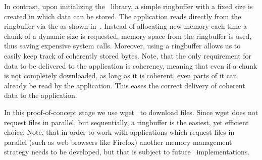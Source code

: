 In contrast, upon initializing the \protonew~library, a simple ringbuffer with a fixed size is created in which data can be stored. 
The application reads directly from the ringbuffer via the  as shown in~. 
Instead of allocating new memory each time a chunk of a dynamic size is requested, memory space from the ringbuffer is used, thus saving expensive system calls. 
Moreover, using a ringbuffer allows us to easily keep track of coherently stored bytes. 
Note, that the only requirement for data to be delivered to the application is coherency, meaning that even if a chunk is not completely downloaded, as long as it is coherent, even parts of it can already be read by the application.
This eases the correct delivery of coherent data to the application. 

In this proof-of-concept stage we use wget~\cite{URL-WGET} to download files. 
Since wget does not request files in parallel, but sequentially, a ringbuffer is the easiest, yet efficient choice. 
Note, that in order to work with applications which request files in parallel (such as web browsers like Firefox) another memory management strategy needs to be developed, but that is subject to future \mhttp~implementations. 



